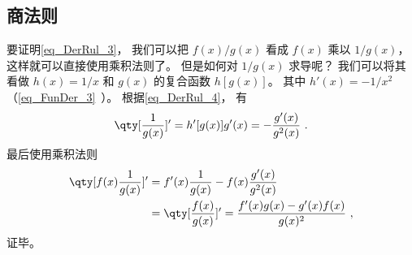 \subsection{商法则}
要证明\autoref{eq_DerRul_3}， 我们可以把 $f(x)/g(x)$ 看成 $f(x)$ 乘以 $1/g(x)$， 这样就可以直接使用乘积法则了。 但是如何对 $1/g(x)$ 求导呢？ 我们可以将其看做 $h(x) = 1/x$ 和 $g(x)$ 的复合函数 $h[g(x)]$。 其中 $h'(x) = -1/x^2$（\autoref{eq_FunDer_3}~）。 根据\autoref{eq_DerRul_4}， 有
\begin{equation}
\qty[\frac{1}{g(x)}]' = h'[g(x)]g'(x) = -\frac{g'(x)}{g^2(x)}~.
\end{equation}
最后使用乘积法则
\begin{equation}
\begin{aligned}
\qty[f(x) \frac{1}{g(x)}]' &= f'(x) \frac{1}{g(x)} - f(x) \frac{g'(x)}{g^2(x)}\\
&= \qty[ \frac{f(x)}{g(x)} ]'  = \frac{f'(x)g(x) - g'(x)f(x)}{g(x)^2}~,
\end{aligned}
\end{equation}
证毕。
